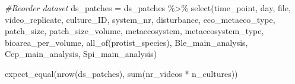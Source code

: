 \documentclass[
]{article}
\newenvironment{Shaded}{\begin{snugshade}}{\end{snugshade}}
\newcommand{\CommentTok}[1]{\textcolor[rgb]{0.56,0.35,0.01}{\textit{#1}}}
\newcommand{\FunctionTok}[1]{\textcolor[rgb]{0.00,0.00,0.00}{#1}}
\newcommand{\NormalTok}[1]{#1}
\newcommand{\OtherTok}[1]{\textcolor[rgb]{0.56,0.35,0.01}{#1}}
\newcommand{\SpecialCharTok}[1]{\textcolor[rgb]{0.00,0.00,0.00}{#1}}
\begin{document}
\begin{Shaded}
\begin{Highlighting}[]
\CommentTok{\#Reorder dataset}
\NormalTok{ds\_patches }\OtherTok{=}\NormalTok{ ds\_patches }\SpecialCharTok{\%\textgreater{}\%}
  \FunctionTok{select}\NormalTok{(time\_point,}
\NormalTok{         day,}
\NormalTok{         file,}
\NormalTok{         video\_replicate,}
\NormalTok{         culture\_ID,}
\NormalTok{         system\_nr,}
\NormalTok{         disturbance,}
\NormalTok{         eco\_metaeco\_type,}
\NormalTok{         patch\_size,}
\NormalTok{         patch\_size\_volume,}
\NormalTok{         metaecosystem,}
\NormalTok{         metaecosystem\_type,}
\NormalTok{         bioarea\_per\_volume,}
         \FunctionTok{all\_of}\NormalTok{(protist\_species),}
\NormalTok{         Ble\_main\_analysis,}
\NormalTok{         Cep\_main\_analysis,}
\NormalTok{         Spi\_main\_analysis)}

\FunctionTok{expect\_equal}\NormalTok{(}\FunctionTok{nrow}\NormalTok{(ds\_patches), }
             \FunctionTok{sum}\NormalTok{(nr\_videos }\SpecialCharTok{*}\NormalTok{ n\_cultures))}
\end{Highlighting}
\end{Shaded}
\end{document}
